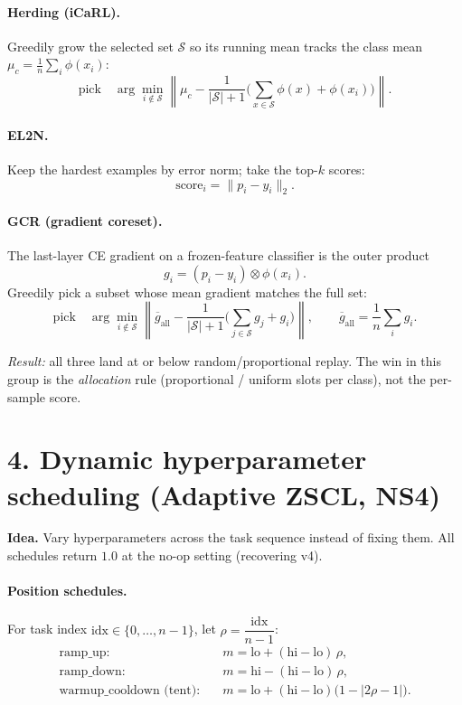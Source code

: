 \documentclass[11pt]{article}
\begin{document}
\paragraph{Herding (iCaRL).} Greedily grow the selected set $\mathcal{S}$ so its running mean tracks the
class mean $\mu_c = \frac{1}{n}\sum_i \phi(x_i)$:
\[
\text{pick}\quad \arg\min_{i \notin \mathcal{S}}
\left\lVert \mu_c - \frac{1}{|\mathcal{S}|+1}\Big(\sum_{x\in\mathcal{S}}\phi(x) + \phi(x_i)\Big) \right\rVert .
\]

\paragraph{EL2N.} Keep the hardest examples by error norm; take the top-$k$ scores:
\[
\text{score}_i = \lVert p_i - y_i \rVert_2 .
\]

\paragraph{GCR (gradient coreset).} The last-layer CE gradient on a frozen-feature classifier is the outer product
\[
g_i = (p_i - y_i) \otimes \phi(x_i).
\]
Greedily pick a subset whose mean gradient matches the full set:
\[
\text{pick}\quad \arg\min_{i \notin \mathcal{S}}
\left\lVert \overline{g}_{\text{all}} - \frac{1}{|\mathcal{S}|+1}\Big(\sum_{j\in\mathcal{S}} g_j + g_i\Big) \right\rVert,
\qquad \overline{g}_{\text{all}} = \frac{1}{n}\sum_i g_i .
\]

\emph{Result:} all three land at or below random/proportional replay. The win in this group is the
\emph{allocation} rule (proportional / uniform slots per class), not the per-sample score.

\section*{4. Dynamic hyperparameter scheduling (Adaptive ZSCL, NS4)}

\textbf{Idea.} Vary hyperparameters across the task sequence instead of fixing them. All schedules
return $1.0$ at the no-op setting (recovering v4).

\paragraph{Position schedules.} For task index $\mathrm{idx}\in\{0,\dots,n-1\}$, let $\rho = \dfrac{\mathrm{idx}}{n-1}$:
\begin{align}
\text{ramp\_up:}\quad & m = \mathrm{lo} + (\mathrm{hi}-\mathrm{lo})\,\rho, \\
\text{ramp\_down:}\quad & m = \mathrm{hi} - (\mathrm{hi}-\mathrm{lo})\,\rho, \\
\text{warmup\_cooldown (tent):}\quad & m = \mathrm{lo} + (\mathrm{hi}-\mathrm{lo})\big(1 - |2\rho - 1|\big).
\end{align}
\end{document}
